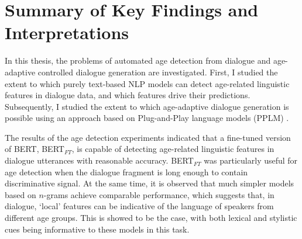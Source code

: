 \section{Summary of Key Findings and Interpretations}

In this thesis, the problems of automated age detection from dialogue and age-adaptive controlled dialogue generation are investigated. First, I studied the extent to which purely text-based NLP models can detect age-related linguistic features in dialogue data, and which features drive their predictions. Subsequently, I studied the extent to which age-adaptive dialogue generation is possible using an approach based on Plug-and-Play language models (PPLM) \citep{dathathri2019plug}.

The results of the age detection experiments indicated that a fine-tuned version of BERT, BERT$_{FT}$, is capable of detecting age-related linguistic features in dialogue utterances with reasonable accuracy. BERT$_{FT}$ was particularly useful for age detection when the dialogue fragment is long enough to contain discriminative signal. At the same time, it is observed that much simpler models based on $n$-grams achieve comparable performance, which suggests that, in dialogue, ‘local’ features can be indicative of the language of speakers from different age groups. This is showed to be the case, with both lexical and stylistic cues being informative to these models in this task.



